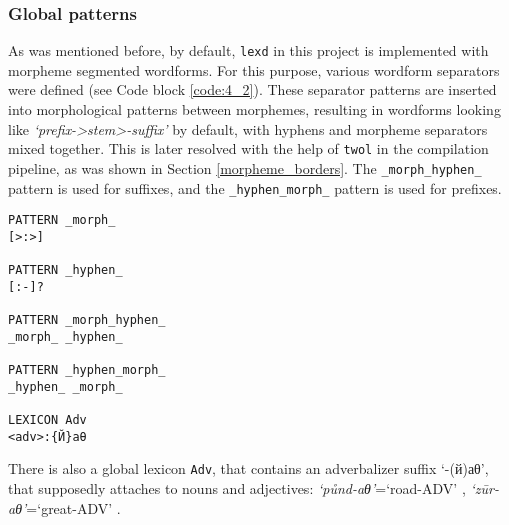 \subsubsection*{Global patterns}
As was mentioned before, by default, \texttt{lexd} in this project is implemented with morpheme segmented wordforms. For this purpose, various wordform separators were defined (see Code block \ref{code:4_2}). These separator patterns are inserted into morphological patterns between morphemes, resulting in wordforms looking like \textit{`prefix->stem>-suffix'} by default, with hyphens and morpheme separators mixed together. This is later resolved with the help of \texttt{twol} in the compilation pipeline, as was shown in Section \ref{morpheme_borders}. The \texttt{\_morph\_hyphen\_} pattern is used for suffixes, and the \texttt{\_hyphen\_morph\_} pattern is used for prefixes.

\begin{code_frame}[float,floatplacement=!h]
    \begin{footnotesize}\codespacing
    \begin{verbatim}
PATTERN _morph_
[>:>]

PATTERN _hyphen_
[:-]?

PATTERN _morph_hyphen_
_morph_ _hyphen_

PATTERN _hyphen_morph_
_hyphen_ _morph_       

LEXICON Adv
<adv>:{Й}аθ
    \end{verbatim}
    \end{footnotesize}
    \tcblower
    \label{code:4_2}
\end{code_frame}

There is also a global lexicon \texttt{Adv}, that contains an adverbalizer suffix `-(й)аθ', that supposedly attaches to nouns and adjectives: \textit{`půnd-aθ'}=`road-ADV' \parencite[139]{parker_shughni_2023}, \textit{`zūr-aθ'}=`great-ADV' \parencite[433]{parker_shughni_2023}. 

